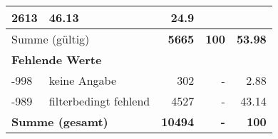 \begin{longtable}{lXrrr}
       \num{2613} &
       \num[round-mode=places,round-precision=2]{46.13} &
         \num[round-mode=places,round-precision=2]{24.9} \\
     \midrule
     \multicolumn{2}{l}{Summe (gültig)} &
       \textbf{\num{5665}} &
     \textbf{\num{100}} &
       \textbf{\num[round-mode=places,round-precision=2]{53.98}} \\
     \multicolumn{5}{l}{\textbf{Fehlende Werte}}\\
       -998 &
       keine Angabe &
         \num{302} &
        - &
         \num[round-mode=places,round-precision=2]{2.88} \\
       -989 &
       filterbedingt fehlend &
         \num{4527} &
        - &
         \num[round-mode=places,round-precision=2]{43.14} \\
     \midrule
     \multicolumn{2}{l}{\textbf{Summe (gesamt)}} &
          \textbf{\num{10494}} &
        \textbf{-} &
        \textbf{\num{100}} \\
     \bottomrule
     \end{longtable}
     
